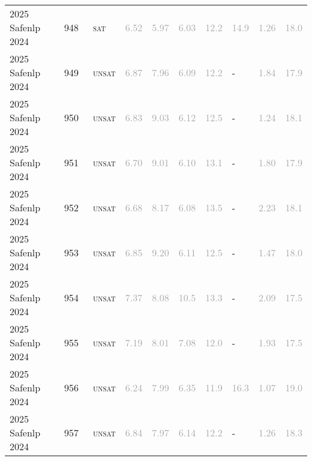 \begin{center}
{\begin{longtable}{@{}llllllllll@{}}
2025 Safenlp 2024 & 948 & ~\textsc{sat} & \textcolor{darkgray}{6.52} & \textcolor{darkgray}{5.97} & \textcolor{darkgray}{6.03} & \textcolor{darkgray}{12.2} & \textcolor{darkgray}{14.9} & \textcolor{darkgray}{1.26} & \textcolor{darkgray}{18.0} \\
2025 Safenlp 2024 & 949 & ~\textsc{unsat} & \textcolor{darkgray}{6.87} & \textcolor{darkgray}{7.96} & \textcolor{darkgray}{6.09} & \textcolor{darkgray}{12.2} & - & \textcolor{darkgray}{1.84} & \textcolor{darkgray}{17.9} \\
2025 Safenlp 2024 & 950 & ~\textsc{unsat} & \textcolor{darkgray}{6.83} & \textcolor{darkgray}{9.03} & \textcolor{darkgray}{6.12} & \textcolor{darkgray}{12.5} & - & \textcolor{darkgray}{1.24} & \textcolor{darkgray}{18.1} \\
2025 Safenlp 2024 & 951 & ~\textsc{unsat} & \textcolor{darkgray}{6.70} & \textcolor{darkgray}{9.01} & \textcolor{darkgray}{6.10} & \textcolor{darkgray}{13.1} & - & \textcolor{darkgray}{1.80} & \textcolor{darkgray}{17.9} \\
2025 Safenlp 2024 & 952 & ~\textsc{unsat} & \textcolor{darkgray}{6.68} & \textcolor{darkgray}{8.17} & \textcolor{darkgray}{6.08} & \textcolor{darkgray}{13.5} & - & \textcolor{darkgray}{2.23} & \textcolor{darkgray}{18.1} \\
2025 Safenlp 2024 & 953 & ~\textsc{unsat} & \textcolor{darkgray}{6.85} & \textcolor{darkgray}{9.20} & \textcolor{darkgray}{6.11} & \textcolor{darkgray}{12.5} & - & \textcolor{darkgray}{1.47} & \textcolor{darkgray}{18.0} \\
2025 Safenlp 2024 & 954 & ~\textsc{unsat} & \textcolor{darkgray}{7.37} & \textcolor{darkgray}{8.08} & \textcolor{darkgray}{10.5} & \textcolor{darkgray}{13.3} & - & \textcolor{darkgray}{2.09} & \textcolor{darkgray}{17.5} \\
2025 Safenlp 2024 & 955 & ~\textsc{unsat} & \textcolor{darkgray}{7.19} & \textcolor{darkgray}{8.01} & \textcolor{darkgray}{7.08} & \textcolor{darkgray}{12.0} & - & \textcolor{darkgray}{1.93} & \textcolor{darkgray}{17.5} \\
2025 Safenlp 2024 & 956 & ~\textsc{unsat} & \textcolor{darkgray}{6.24} & \textcolor{darkgray}{7.99} & \textcolor{darkgray}{6.35} & \textcolor{darkgray}{11.9} & \textcolor{darkgray}{16.3} & \textcolor{darkgray}{1.07} & \textcolor{darkgray}{19.0} \\
2025 Safenlp 2024 & 957 & ~\textsc{unsat} & \textcolor{darkgray}{6.84} & \textcolor{darkgray}{7.97} & \textcolor{darkgray}{6.14} & \textcolor{darkgray}{12.2} & - & \textcolor{darkgray}{1.26} & \textcolor{darkgray}{18.3} \\

\end{longtable}}
\end{center}
